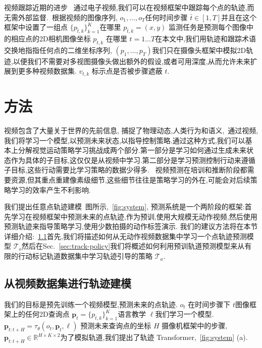 \documentclass[conference]{IEEEtran}
\begin{document}
 视频跟踪近期的进步~\cite{harley2022particle, doersch2023tapvid, doersch2023tapir, wang2023tracking, zheng2023pointodyssey} 通过电子视频,我们可以在视频框架中跟踪每个点的轨迹,而无需外部监督.~\cite{karaev2023cotracker}根据视频的图像序列, $o_1, ..., o_T$任何时间步骤 $\bar{t} \in [1, T]$并且在这个框架中设置了一组点 $\{p_{\bar{t}, k}\}_{k=1}^{K}$在哪里 $p_{\bar{t}, k} = (x, y)$ 监测任务是预测每个图像中的相应点的2D相机图像坐标 $p_{t, k}$ 在哪里 $t =1 \dots T$在本文中,我们用轨迹和跟踪术语交换地指指任何点的二维坐标序列, $(p_1, \dots, p_T)$我们只在摄像头框架中模拟2D轨迹,以便我们不需要对多视图摄像头做出额外的假设,或者可用深度,从而允许未来扩展到更多种视频数据集. $v_{t, k}$ 标示点是否被步骤遮蔽 $t$.

\section{方法}
视频包含了大量关于世界的先前信息, 捕捉了物理动态,人类行为和语义,~\cite{sermanet2017tcn,nair2023r3m,ma2023vip}通过视频,我们将学习一个模型,以预测未来状态,以指导控制策略.通过这种方式,我们可以基本上分解视觉运动策略学习挑战成两个部分.第一部分是学习如何通过生成未来状态作为具体的子目标,这仅仅是从视频中学习.第二部分是学习预测控制行动来遵循子目标,这些行动需要比学习策略的数据少得多.~\cite{du2023unipi,Ko2023Learning,black2023zero} 视频预测在培训和推断阶段都需要资源,但其重点重建像素级细节,这些细节往往是策略学习的外在,可能会对后续策略学习的效率产生不利影响.

我们提出任意点轨迹建模~图所示,~\ref{fig:system}, 
预测系统是一个两阶段的框架:首先学习在视频框架中预测未来的点轨迹,作为预训,使用大规模无动作视频,然后使用预测轨迹来指导策略学习,使用少数拍摄的动作标签演示. 我们的建议方法将在本节详细介绍:~\ref{sec:track-model}首先,我们将描述如何从无动作视频数据集中学习一个点轨迹预测模型 $\mathcal{T}_{o}$然后在Sec.~\ref{sec:track-policy}我们将概述如何利用预训轨道预测模型来从有限的行动标记轨道数据集中学习轨迹引导的策略 $\mathcal{T}_a$.

\subsection{从视频数据集进行轨迹建模} \label{sec:track-model}
我们的目标是预先训练一个视频模型,预测未来的点轨迹. $o_t$ 在时间步骤下 $t$图像框架上的任何2D查询点 $\mathbf{p}_t = \{p_{t, k}\}_{k=1}^K$语言教学 $\ell$我们学习一个模型. $\mathbf{p}_{t:t+H} = \tau_\theta(o_t, \mathbf{p}_t, \ell)$ 预测未来查询点的坐标 $H$ 摄像机框架中的步骤,  $\mathbf{p}_{t:t+H} \in \mathbb{R}^{H \times K \times 2}$为了模拟轨道,我们提出了轨迹 Transformer,~\ref{fig:system} (a).
\end{document}

